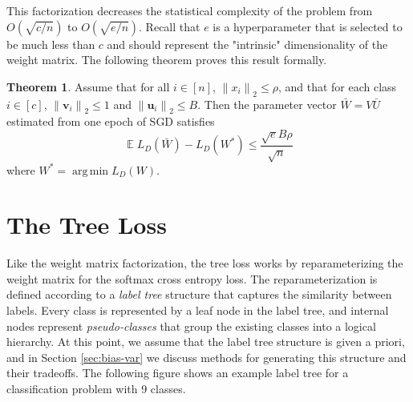 \documentclass[twoside]{article}
\theoremstyle{definition}
\newtheorem{theorem}{Theorem}
\DeclareMathOperator{\E}{\mathbb E}
\DeclareMathOperator*{\argmin}{arg\,min}
\newcommand{\vv}{\mathbf v}
\newcommand{\uu}{\mathbf u}
\newcommand{\ltwo}[1]{{\lVert {#1} \rVert}_2}
\newcommand{\fixme}[1]{\noindent{\color{red}\textbf{FIXME:}  {#1}}}
\begin{document}
This factorization decreases the statistical complexity of the problem from $O(\sqrt{c/n})$ to $O(\sqrt{e/n})$.
Recall that $e$ is a hyperparameter that is selected to be much less than $c$ and should represent the "intrinsic" dimensionality of the weight matrix.
The following theorem proves this result formally.
\begin{theorem}
Assume that for all $i\in[n]$, $\ltwo{x_i} \le \rho$,
    and that for each class $i\in[c]$, $\ltwo{\vv_i}\le 1$ and $\ltwo{\uu_i}\le B$.
Then the parameter vector $\bar W = V \bar U$ estimated from one epoch of SGD satisfies
\begin{equation}
    \E L_D(\bar W) - L_D(W^*) \le \frac {\sqrt eB\rho}{\sqrt n}
\end{equation}
where $W^* = \argmin L_D(W)$.
\end{theorem}


\section{The Tree Loss}

Like the weight matrix factorization, the tree loss works by reparameterizing the weight matrix for the softmax cross entropy loss.
The reparameterization is defined according to a \emph{label tree} structure that captures the similarity between labels.
Every class is represented by a leaf node in the label tree,
and internal nodes represent \emph{pseudo-classes} that group the existing classes into a logical hierarchy.
At this point, we assume that the label tree structure is given a priori, and in Section \ref{sec:bias-var} we discuss methods for generating this structure and their tradeoffs.
The following figure shows an example label tree for a classification problem with 9 classes.
\end{document}
